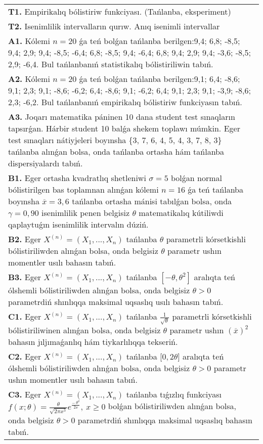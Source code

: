 \documentclass{article}
\begin{document}
\begin{tabular}{m{17cm}}
\textbf{T1.} 
Empirikalıq bólistiriw funkciyası. (Tańlanba, eksperiment)
 \\
\textbf{T2.} 
Isenimlilik intervalların qurıw. Anıq isenimli intervallar
 \\
\textbf{A1.} 
Kólemi \(n = 20\) ǵa teń bolǵan tańlanba berilgen:9,4; 6,8; -8,5; 9,4; 2,9; 9,4; -8,5; -6,4; 6,8; -8,5; 9,4; -6,4; 6,8; 9,4; 2,9; 9,4; -3,6; -8,5; 2,9; -6,4. Bul tańlanbanıń statistikalıq bólistiriliwin tabıń.
 \\
\textbf{A2.} 
Kólemi \(n = 20\) ǵa teń bolǵan tańlanba berilgen:9,1; 6,4; -8,6; 9,1; 2,3; 9,1; -8,6; -6,2; 6,4; -8,6; 9,1; -6,2; 6,4; 9,1; 2,3; 9,1; -3,9; -8,6; 2,3; -6,2. Bul tańlanbanıń empirikalıq bólistiriw funkciyasın tabıń.
 \\
\textbf{A3.} 
Joqarı matematika páninen 10 dana student test sınaqların tapsırǵan. Hárbir student 10 balǵa shekem toplawı múmkin. Eger test sınaqları nátiyjeleri boyınsha \{3, 7, 6, 4, 5, 4, 3, 7, 8, 3\} tańlanba alınǵan bolsa, onda tańlanba ortasha hám tańlanba dispersiyalardı tabıń.
 \\
\textbf{B1.} 
Eger ortasha kvadratlıq shetleniwi \(\sigma = 5\) bolǵan normal bólistirilgen bas toplamnan alınǵan kólemi \(n = 16\) ǵa teń tańlanba boyınsha \(\overline{x} = 3,6\) tańlanba ortasha mánisi tabılǵan bolsa, onda \(\gamma = 0,90\) isenimlilik penen belgisiz \(\theta\) matematikalıq kútiliwdi qaplaytuǵın isenimlilik intervalın dúziń.
 \\
\textbf{B2.} 
Eger \(X^{(n)} = \left( X_{1},...,X_{n} \right)\) tańlanba \(\theta\) parametrli kórsetkishli bólistiriliwden alınǵan bolsa, onda belgisiz \(\theta\) parametr ushın momentler usılı bahasın tabıń.
 \\
\textbf{B3.} 
Eger \(X^{(n)} = \left( X_{1},...,X_{n} \right)\) tańlanba \(\left\lbrack - \theta,\theta^{2} \right\rbrack\) aralıqta teń ólshemli bólistiriliwden alınǵan bolsa, onda belgisiz \(\theta > 0\) parametrdiń shınlıqqa maksimal uqsaslıq usılı bahasın tabıń.
 \\
\textbf{C1.} 
Eger \(X^{(n)} = \left( X_{1},...,X_{n} \right)\) tańlanba \(\frac{1}{\sqrt{\theta}}\) parametrli kórsetkishli bólistiriliwinen alınǵan bolsa, onda belgisiz \(\theta\) parametr ushın \((\overline{x})^{2}\) bahasın jıljımaǵanlıq hám tiykarlılıqqa tekseriń.
 \\
\textbf{C2.} 
Eger \(X^{(n)} = \left( X_{1},...,X_{n} \right)\) tańlanba {[}\(0,2\theta\rbrack\) aralıqta teń ólshemli bólistiriliwden alınǵan bolsa, onda belgisiz \(\theta > 0\) parametr ushın momentler usılı bahasın tabıń.
 \\
\textbf{C3.} 
Eger \(X^{(n)} = \left( X_{1},...,X_{n} \right)\) tańlanba tıǵızlıq funkciyası
$f(x;\theta) = \frac{\theta}{\sqrt{2\pi x^{3}}}e^{\frac{- \ \theta^{2}}{2x}},\ x \geq 0$
bolǵan bólistiriliwden alınǵan bolsa, onda belgisiz \(\theta > 0\) parametrdiń shınlıqqa maksimal uqsaslıq bahasın tabıń.
 \\

\end{tabular}
\vspace{1cm}
\end{document}
